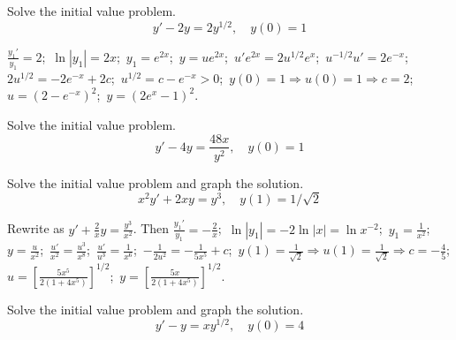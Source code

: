 \documentclass{ximera}
\begin{document}
\begin{problem}\label{exer:2.4.10} Solve the initial value problem.
$$y'-2y=2y^{1/2},\quad y(0)=1$$



\begin{solution}
    $\frac{y_1'}{ y_1}=2$;\,
$\ln|y_1|=2x$;\,
$y_1=e^{2x}$;\,
$y=ue^{2x}$;\,
$u'e^{2x}=2u^{1/2}e^x$;\,
$u^{-1/2}u'=2e^{-x}$;\,
$2u^{1/2}=-2e^{-x}+2c$;\,
$u^{1/2}=c-e^{-x}>0$;\,
$y(0)=1\Rightarrow u(0)=1\Rightarrow
c=2$;\,
$u=(2-e^{-x})^2$;\,
$y=(2e^x-1)^2$.
\end{solution}
\end{problem}

\begin{problem}\label{exer:2.4.11} Solve the initial value problem. 
$$y'-4y=\frac{48x}{y^2},\quad y(0)=1$$
\end{problem}

\begin{problem}\label{exer:2.4.12} Solve the initial value problem and graph the solution. 
$$x^2y'+2xy=y^3,\quad y(1)=1/\sqrt2$$



\begin{solution}
    Rewrite as $y'+\frac{2}{ x}y=\frac{y^3}{ x^2}$. Then
$\frac{y_1'}{ y_1}=-\frac{2}{ x}$;\,
$\ln|y_1|=-2\ln|x|=\ln x^{-2}$;\,
$y_1=\frac{1}{ x^2}$;\,
$y=\frac{u}{ x^2}$;\,
$\frac{u'}{ x^2}=\frac{u^3}{ x^8}$;\,
$\frac{u'}{ u^3}=\frac{1}{ x^6}$;\,
$-\frac{1}{2u^2}=-\frac{1}{5x^5}+c$;\,
$y(1)=\frac{1}{\sqrt2}\Rightarrow u(1)=\frac{1}{\sqrt2}\Rightarrow
c=-\frac{4}{5}$;\,
$u=\left[\frac{5x^5}{2(1+4x^5)}\right]^{1/2}$;\,
$y=\left[\frac{5x}{2(1+4x^5)}\right]^{1/2}$.
\end{solution}
\end{problem}

\begin{problem}\label{exer:2.4.13} Solve the initial value problem and graph the solution.
$$y'-y=xy^{1/2},\quad y(0)=4$$
\end{problem}
\end{document}
